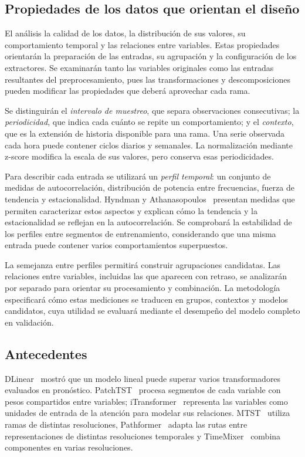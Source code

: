 \documentclass[11pt,letterpaper]{article}
\begin{document}
\subsection{Propiedades de los datos que orientan el diseño}

El análisis la calidad de los datos, la distribución de sus valores, su comportamiento temporal y las relaciones entre variables. Estas propiedades orientarán la preparación de las entradas, su agrupación y la configuración de los extractores. Se examinarán tanto las variables originales como las entradas resultantes del preprocesamiento, pues las transformaciones y descomposiciones pueden modificar las propiedades que deberá aprovechar cada rama.

Se distinguirán el \emph{intervalo de muestreo}, que separa observaciones consecutivas; la \emph{periodicidad}, que indica cada cuánto se repite un comportamiento; y el \emph{contexto}, que es la extensión de historia disponible para una rama. Una serie observada cada hora puede contener ciclos diarios y semanales. La normalización mediante z-score modifica la escala de sus valores, pero conserva esas periodicidades.

Para describir cada entrada se utilizará un \emph{perfil temporal}: un conjunto de medidas de autocorrelación, distribución de potencia entre frecuencias, fuerza de tendencia y estacionalidad. Hyndman y Athanasopoulos~\cite{hyndman2021tscv} presentan medidas que permiten caracterizar estos aspectos y explican cómo la tendencia y la estacionalidad se reflejan en la autocorrelación. Se comprobará la estabilidad de los perfiles entre segmentos de entrenamiento, considerando que una misma entrada puede contener varios comportamientos superpuestos.

La semejanza entre perfiles permitirá construir agrupaciones candidatas. Las relaciones entre variables, incluidas las que aparecen con retraso, se analizarán por separado para orientar su procesamiento y combinación. La metodología especificará cómo estas mediciones se traducen en grupos, contextos y modelos candidatos, cuya utilidad se evaluará mediante el desempeño del modelo completo en validación.

\subsection{Antecedentes}

DLinear~\cite{zeng2023dlinear} mostró que un modelo lineal puede superar varios transformadores evaluados en pronóstico. PatchTST~\cite{nie2023patchtst} procesa segmentos de cada variable con pesos compartidos entre variables; iTransformer~\cite{liu2024itransformer} representa las variables como unidades de entrada de la atención para modelar sus relaciones. MTST~\cite{zhang2024mtst} utiliza ramas de distintas resoluciones, Pathformer~\cite{chen2024pathformer} adapta las rutas entre representaciones de distintas resoluciones temporales y TimeMixer~\cite{wang2024timemixer} combina componentes en varias resoluciones.
\end{document}
